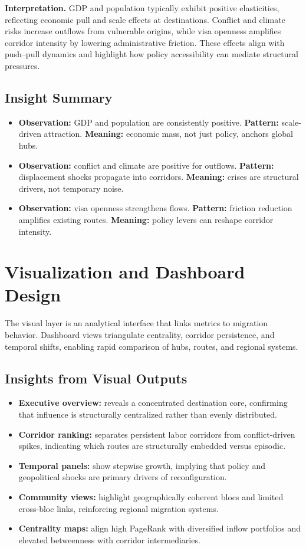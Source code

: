 \documentclass[12pt]{report}
\begin{document}
  \textbf{Interpretation.} GDP and population typically exhibit positive elasticities, reflecting economic pull and scale effects at destinations. Conflict and climate risks increase outflows from vulnerable origins, while visa openness amplifies corridor intensity by lowering administrative friction. These effects align with push--pull dynamics and highlight how policy accessibility can mediate structural pressures.

\section*{Insight Summary}
\begin{itemize}
  \item \textbf{Observation:} GDP and population are consistently positive. \textbf{Pattern:} scale-driven attraction. \textbf{Meaning:} economic mass, not just policy, anchors global hubs.
  \item \textbf{Observation:} conflict and climate are positive for outflows. \textbf{Pattern:} displacement shocks propagate into corridors. \textbf{Meaning:} crises are structural drivers, not temporary noise.
  \item \textbf{Observation:} visa openness strengthens flows. \textbf{Pattern:} friction reduction amplifies existing routes. \textbf{Meaning:} policy levers can reshape corridor intensity.
\end{itemize}

\chapter{Visualization and Dashboard Design}
The visual layer is an analytical interface that links metrics to migration behavior. Dashboard views triangulate centrality, corridor persistence, and temporal shifts, enabling rapid comparison of hubs, routes, and regional systems.

\section*{Insights from Visual Outputs}
\begin{itemize}
  \item \textbf{Executive overview:} reveals a concentrated destination core, confirming that influence is structurally centralized rather than evenly distributed.
  \item \textbf{Corridor ranking:} separates persistent labor corridors from conflict-driven spikes, indicating which routes are structurally embedded versus episodic.
  \item \textbf{Temporal panels:} show stepwise growth, implying that policy and geopolitical shocks are primary drivers of reconfiguration.
  \item \textbf{Community views:} highlight geographically coherent blocs and limited cross-bloc links, reinforcing regional migration systems.
  \item \textbf{Centrality maps:} align high PageRank with diversified inflow portfolios and elevated betweenness with corridor intermediaries.
\end{itemize}
\end{document}
